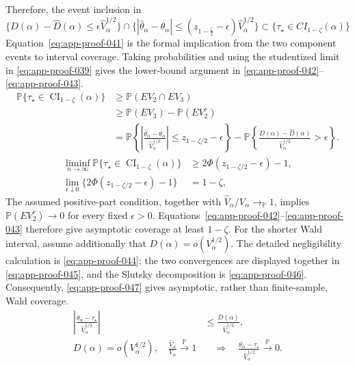 \documentclass[11pt]{article}
\numberwithin{equation}{section}
\newcommand{\Pbb}{\mathbb P}
\newcommand{\1}{\mathbf 1}
\newcommand{\abs}[1]{\left\lvert #1\right\rvert}
\begin{document}
Therefore, the event inclusion in
\begin{equation}
\label{eq:app-proof-041}
\{D(\alpha)-\widehat D(\alpha)\leq \epsilon \widehat V_{\alpha}^{1/2}\}
\cap \{\abs{\widehat\theta_{\alpha}-\theta_{\alpha}}\leq (z_{1-\frac{\zeta}2}-\epsilon)\widehat V_{\alpha}^{1/2}\}\subset \{\tau_\star \in CI_{1-\zeta}(\alpha)\}
\end{equation}
Equation~\eqref{eq:app-proof-041} is the formal implication from the two
component events to interval coverage.  Taking probabilities and using the
studentized limit in \eqref{eq:app-proof-039} gives the lower-bound argument
in \eqref{eq:app-proof-042}--\eqref{eq:app-proof-043}.
\begin{equation}
\label{eq:app-proof-042}
\begin{aligned}
\Pbb\{\tau_\star\in\operatorname{CI}_{1-\zeta}(\alpha)\}
&\ge\Pbb(EV_2\cap EV_3)\\
&\ge\Pbb(EV_3)-\Pbb(EV_2^c)\\
&=\Pbb\!\left\{
\abs{\frac{\widehat\theta_\alpha-\theta_\alpha}
{\widehat V_\alpha^{1/2}}}
\le z_{1-\zeta/2}-\epsilon
\right\}
-\Pbb\!\left\{
\frac{D(\alpha)-\widehat D(\alpha)}
{\widehat V_\alpha^{1/2}}>\epsilon
\right\}.
\end{aligned}
\end{equation}
\begin{equation}
\label{eq:app-proof-043}
\begin{aligned}
\liminf_{n\to\infty}
\Pbb\{\tau_\star\in\operatorname{CI}_{1-\zeta}(\alpha)\}
&\ge 2\Phi(z_{1-\zeta/2}-\epsilon)-1,\\
\lim_{\epsilon\downarrow0}
\{2\Phi(z_{1-\zeta/2}-\epsilon)-1\}
&=1-\zeta,
\end{aligned}
\end{equation}
The assumed positive-part condition, together with \(\widehat V_\alpha/V_\alpha\to_{\Pbb}1\), implies \(\Pbb(EV_2^c)\to0\) for every fixed \(\epsilon>0\).  Equations~\eqref{eq:app-proof-042}--\eqref{eq:app-proof-043} therefore give asymptotic coverage at least \(1-\zeta\).  For the shorter Wald interval, assume additionally that \(D(\alpha)=o(V_\alpha^{1/2})\).  The detailed negligibility calculation is \eqref{eq:app-proof-044}; the two convergences are displayed together in \eqref{eq:app-proof-045}, and the Slutsky decomposition is \eqref{eq:app-proof-046}.  Consequently, \eqref{eq:app-proof-047} gives asymptotic, rather than finite-sample, Wald coverage.
\begin{equation}
\label{eq:app-proof-044}
\begin{aligned}
\abs{\frac{\theta_\alpha-\tau_\star}
{\widehat V_\alpha^{1/2}}}
&\le\frac{D(\alpha)}{\widehat V_\alpha^{1/2}},\\
D(\alpha)=o(V_\alpha^{1/2}),\quad
\frac{\widehat V_\alpha}{V_\alpha}\xrightarrow{\Pbb}1
&\quad\Longrightarrow\quad
\frac{\theta_\alpha-\tau_\star}
{\widehat V_\alpha^{1/2}}\xrightarrow{\Pbb}0.
\end{aligned}
\end{equation}
\end{document}
